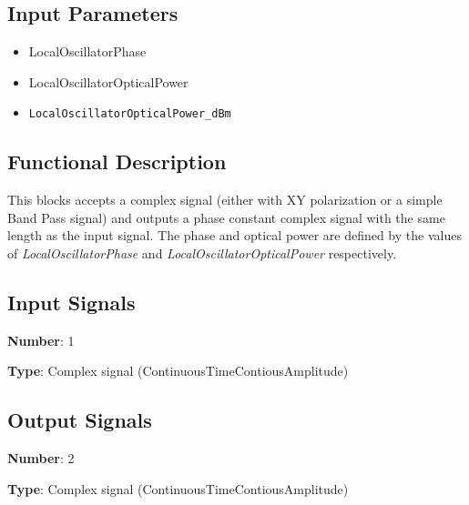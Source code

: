 \documentclass[../../sdf/tex/BPSK_system.tex]{subfiles}
\date{}
\begin{document}
\onlyinsubfile{\maketitle}

\subsection*{Input Parameters}

\begin{multicols}{2}
	\begin{itemize}
		\item LocalOscillatorPhase
		\item LocalOscillatorOpticalPower
		\item \verb|LocalOscillatorOpticalPower_dBm|
	\end{itemize}
\end{multicols}

\subsection*{Functional Description}

This blocks accepts a complex signal (either with XY polarization or a simple Band Pass signal) and outputs a phase constant complex signal with the same length as the input signal. The phase and optical power are defined by the values of \textit{LocalOscillatorPhase} and \textit{LocalOscillatorOpticalPower} respectively.

\subsection*{Input Signals}

\textbf{Number}: 1

\textbf{Type}: Complex signal (ContinuousTimeContiousAmplitude)

\subsection*{Output Signals}

\textbf{Number}: 2

\textbf{Type}: Complex signal (ContinuousTimeContiousAmplitude)
\end{document}
